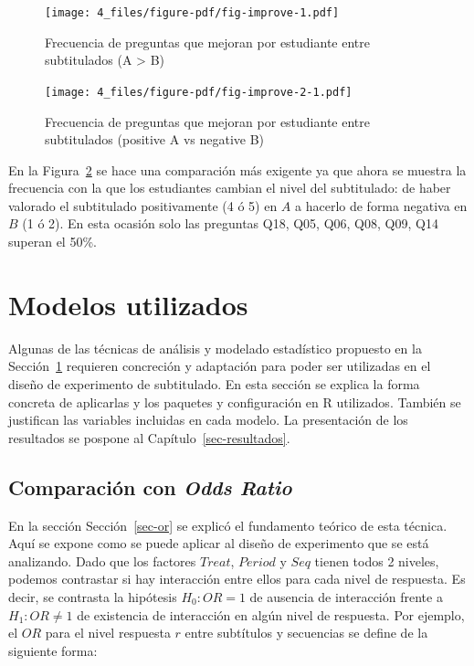 \documentclass[
  12pt,
  a4paper,
  extrafontsizes,
  onecolumn,
  openright,
  table]{memoir}
\begin{document}
\begin{figure}[h]

{\centering \texttt{[image: 4\_files/figure-pdf/fig-improve-1.pdf]}

}

\caption{\label{fig-improve}Frecuencia de preguntas que mejoran por
estudiante entre subtitulados (A \textgreater{} B)}

\end{figure}

\begin{figure}[h]

{\centering \texttt{[image: 4\_files/figure-pdf/fig-improve-2-1.pdf]}

}

\caption{\label{fig-improve-2}Frecuencia de preguntas que mejoran por
estudiante entre subtitulados (positive A vs negative B)}

\end{figure}

En la Figura~\ref{fig-improve-2} se hace una comparación más exigente ya
que ahora se muestra la frecuencia con la que los estudiantes cambian el
nivel del subtitulado: de haber valorado el subtitulado positivamente (4
ó 5) en \(A\) a hacerlo de forma negativa en \(B\) (1 ó 2). En esta
ocasión solo las preguntas Q18, Q05, Q06, Q08, Q09, Q14 superan el 50\%.

\hypertarget{sec-modelos-utilizados}{%
\section{Modelos utilizados}\label{sec-modelos-utilizados}}

Algunas de las técnicas de análisis y modelado estadístico propuesto en
la Sección~\ref{sec-modelos-utilizados} requieren concreción y
adaptación para poder ser utilizadas en el diseño de experimento de
subtitulado. En esta sección se explica la forma concreta de aplicarlas
y los paquetes y configuración en R utilizados. También se justifican
las variables incluidas en cada modelo. La presentación de los
resultados se pospone al Capítulo~\ref{sec-resultados}.

\hypertarget{sec-or-2}{%
\subsection{\texorpdfstring{Comparación con \emph{Odds
Ratio}}{Comparación con Odds Ratio}}\label{sec-or-2}}

En la sección Sección~\ref{sec-or} se explicó el fundamento teórico de
esta técnica. Aquí se expone como se puede aplicar al diseño de
experimento que se está analizando. Dado que los factores \(Treat\),
\(Period\) y \(Seq\) tienen todos 2 niveles, podemos contrastar si hay
interacción entre ellos para cada nivel de respuesta. Es decir, se
contrasta la hipótesis \(H_0: OR=1\) de ausencia de interacción frente a
\(H_1: OR \neq 1\) de existencia de interacción en algún nivel de
respuesta. Por ejemplo, el \(OR\) para el nivel respuesta \(r\) entre
subtítulos y secuencias se define de la siguiente forma:
\end{document}
